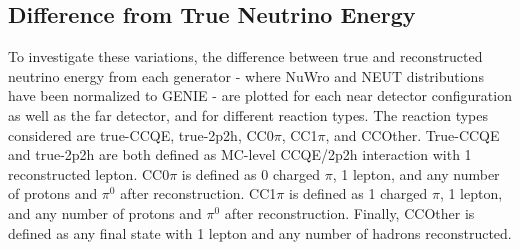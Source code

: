 \documentclass[12pt]{article}
\begin{document}
\subsection{Difference from True Neutrino Energy}
To investigate these variations, the difference between true and reconstructed neutrino energy from each generator - where NuWro and NEUT distributions have been normalized to GENIE - are plotted for each near detector configuration as well as the far detector, and for different reaction types. The reaction types considered are true-CCQE, true-2p2h, CC0$\pi$, CC1$\pi$, and CCOther. True-CCQE and true-2p2h are both defined as MC-level CCQE/2p2h interaction with 1 reconstructed lepton. CC0$\pi$ is defined as 0 charged $\pi$, 1 lepton, and any number of protons and $\pi^0$ after reconstruction. CC1$\pi$ is defined as 1 charged $\pi$, 1 lepton, and any number of protons and $\pi^0$ after reconstruction. Finally, CCOther is defined as any final state with 1 lepton and any number of hadrons reconstructed.
\end{document}
